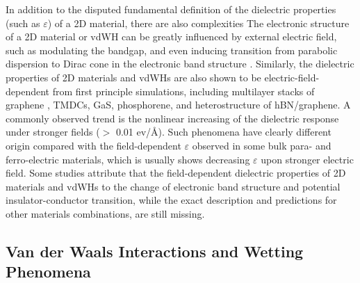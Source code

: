 %
In addition to the disputed fundamental definition of the dielectric
properties (such as $\varepsilon$) of a 2D material, there are also
complexities 
%
The electronic structure of a 2D material or vdWH can be greatly
influenced by external electric field, such as modulating the bandgap,
 and even
inducing transition from parabolic dispersion to Dirac cone in the
electronic band structure .
%
Similarly, the dielectric properties of 2D materials and vdWHs are
also shown to be electric-field-dependent from first principle
simulations,
%
including multilayer stacks of graphene , TMDCs,
GaS, phosphorene, and heterostructure of hBN/graphene.
%
A commonly
observed trend is the nonlinear increasing of the dielectric response
under stronger fields ($>$ 0.01 ev/\AA{}).
%
Such phenomena have clearly different origin compared with the
field-dependent $\varepsilon$ observed in some bulk para- and
ferro-electric materials, which is usually shows decreasing
$\varepsilon$ upon stronger electric field.  
%
Some studies attribute that the field-dependent dielectric properties
of 2D materials and vdWHs to the change of electronic band structure
and potential insulator-conductor transition, while the exact
description and predictions for other materials combinations, are
still missing.
%

\subsection{Van der Waals Interactions and Wetting Phenomena}
\label{sec:van-der-waals}

